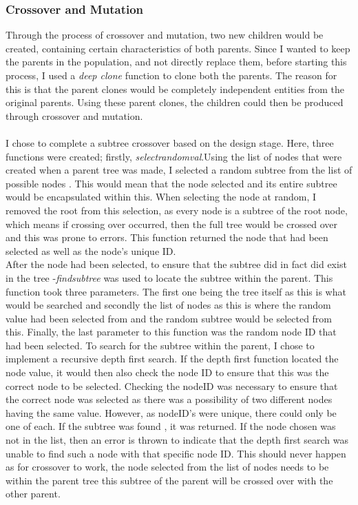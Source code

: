 \documentclass[11pt]{article}
\begin{document}
\subsubsection{Crossover and Mutation}
Through the process of crossover and mutation, two new children would be created, containing certain characteristics of both parents. Since I wanted to keep the parents in the population, and not directly replace them, before starting this process, I used a \textit{deep clone} function to clone both the parents. The reason for this is that the parent clones would be completely independent entities from the original parents. Using these parent clones, the children could then be produced through crossover and mutation. \\
\\
I chose to complete a subtree crossover based on the design stage. Here, three functions were created; firstly, \textit{select\textunderscore random\textunderscore val}.Using the list of nodes that were created when a parent tree was made, I selected a random subtree from the list of possible nodes . This would mean that the node selected and its entire subtree would be encapsulated within this. When selecting the node at random, I removed the root from this selection, as every node is a subtree of the root node, which means if crossing over occurred, then the full tree would be crossed over and this was prone to errors. This function returned the node that had been selected as well as the node's unique ID. \\

After the node had been selected, to ensure that the subtree did in fact did exist in the tree -\textit{find\textunderscore subtree} was used to locate the subtree within the parent. This function took three parameters. The first one being the tree itself as this is what would be searched and secondly the list of nodes as this is where the random value had been selected from and the random subtree would be selected from this. Finally, the last parameter to this function was the random node ID that had been selected. To search for the subtree within the parent, I chose to implement a recursive depth first search. If the depth first function located the node value, it would then also check the node ID to ensure that this was the correct node to be selected. Checking the nodeID was necessary to ensure that the correct node was selected as there was a possibility of two different nodes having the same value. However, as nodeID's were unique, there could only be one of each. If the subtree was found , it was returned. If the node chosen was not in the list, then an error is thrown to indicate that the depth first search was unable to find such a node with that specific node ID. This should never happen as for crossover to work, the node selected from the list of nodes needs to be within the parent tree this subtree of the parent will be crossed over with the other parent. \\
\end{document}
